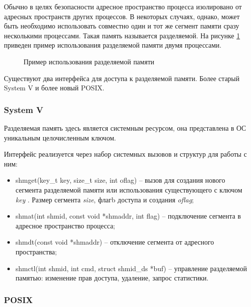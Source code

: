 Обычно в целях безопасности адресное пространство процесса изолировано от адресных пространств других процессов. В некоторых случаях, однако, может быть необходимо использовать совместно один и тот же сегмент памяти сразу несколькими процессами. Такая память называется разделяемой. На рисунке \ref{chapter11:ShMem} приведен пример использования разделяемой памяти двумя процессами.

\begin{figure}[!h]
\caption{Пример использования разделяемой памяти}
\label{chapter11:ShMem}
\end{figure}

Существуют два интерфейса для доступа к разделяемой памяти. Более старый System V и более новый POSIX.

\subsubsection{System V}

Разделяемая память здесь является системным ресурсом, она представлена в ОС уникальным целочисленным ключом.

Интерфейс реализуется через набор системных вызовов и структур для работы с ним:
\begin{itemize}
\item shmget(key\_t key, size\_t size, int oflag) -- вызов для создания нового сегмента разделяемой памяти или использования существующего с ключом \textit{key} . Размер сегмента \textit{size}, флагb доступа и создания \textit{oflag};
\item shmat(int shmid, const void *shmaddr, int flag) -- подключение сегмента в адресное пространство процесса;
\item shmdt(const void *shmaddr) -- отключение сегмента от адресного пространства;
\item shmctl(int shmid, int cmd, struct shmid\_ds *buf) -- управление разделяемой памятью: изменение прав доступа, удаление, запрос статистики.
\end{itemize}

\subsubsection{POSIX}

